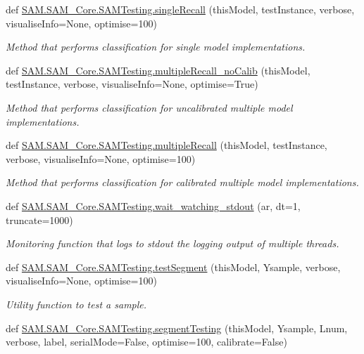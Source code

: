 \begin{DoxyCompactItemize}
def \hyperlink{group__icubclient__SAM__Tests_ga08baf53ab45bde447965b03d0bfa1a35}{S\+A\+M.\+S\+A\+M\+\_\+\+Core.\+S\+A\+M\+Testing.\+single\+Recall} (this\+Model, test\+Instance, verbose, visualise\+Info=None, optimise=100)
\begin{DoxyCompactList}\small\item\em Method that performs classification for single model implementations. \end{DoxyCompactList}\item 
def \hyperlink{group__icubclient__SAM__Tests_gae7639430f294ed485cb2ea03a9bb5095}{S\+A\+M.\+S\+A\+M\+\_\+\+Core.\+S\+A\+M\+Testing.\+multiple\+Recall\+\_\+no\+Calib} (this\+Model, test\+Instance, verbose, visualise\+Info=None, optimise=True)
\begin{DoxyCompactList}\small\item\em Method that performs classification for uncalibrated multiple model implementations. \end{DoxyCompactList}\item 
def \hyperlink{group__icubclient__SAM__Tests_ga684e61ac3df13fa4ae0d20ed03a9979f}{S\+A\+M.\+S\+A\+M\+\_\+\+Core.\+S\+A\+M\+Testing.\+multiple\+Recall} (this\+Model, test\+Instance, verbose, visualise\+Info=None, optimise=100)
\begin{DoxyCompactList}\small\item\em Method that performs classification for calibrated multiple model implementations. \end{DoxyCompactList}\item 
def \hyperlink{group__icubclient__SAM__Tests_gaa209fbf7add0cf59bd93a76f0387d343}{S\+A\+M.\+S\+A\+M\+\_\+\+Core.\+S\+A\+M\+Testing.\+wait\+\_\+watching\+\_\+stdout} (ar, dt=1, truncate=1000)
\begin{DoxyCompactList}\small\item\em Monitoring function that logs to stdout the logging output of multiple threads. \end{DoxyCompactList}\item 
def \hyperlink{group__icubclient__SAM__Tests_gaa5357ad5f4775cd411d35896655374f5}{S\+A\+M.\+S\+A\+M\+\_\+\+Core.\+S\+A\+M\+Testing.\+test\+Segment} (this\+Model, Ysample, verbose, visualise\+Info=None, optimise=100)
\begin{DoxyCompactList}\small\item\em Utility function to test a sample. \end{DoxyCompactList}\item 
def \hyperlink{group__icubclient__SAM__Tests_ga3a78ca830aeec689bb106d1af35c2411}{S\+A\+M.\+S\+A\+M\+\_\+\+Core.\+S\+A\+M\+Testing.\+segment\+Testing} (this\+Model, Ysample, Lnum, verbose, label, serial\+Mode=False, optimise=100, calibrate=False)

\end{DoxyCompactItemize}
